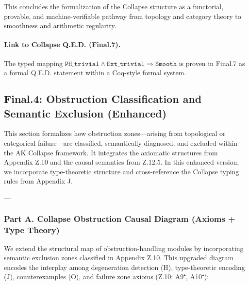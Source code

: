 \documentclass[11pt]{article}
\begin{document}
\begin{axiom}
\begin{axiom}
{{This concludes the formalization of the Collapse structure as a functorial, provable, and machine-verifiable pathway from topology and category theory to smoothness and arithmetic regularity.


\paragraph{Link to Collapse Q.E.D. (Final.7).}
The typed mapping \( \texttt{PH\_trivial} \land \texttt{Ext\_trivial} \Rightarrow \texttt{Smooth} \)  
is proven in Final.7 as a formal Q.E.D. statement within a Coq-style formal system.




\subsection*{Final.4: Obstruction Classification and Semantic Exclusion (Enhanced)}

This section formalizes how obstruction zones—arising from topological or categorical failure—are classified, semantically diagnosed,  
and excluded within the AK Collapse framework. It integrates the axiomatic structures from Appendix Z.10 and the causal semantics from Z.12.5.  
In this enhanced version, we incorporate type-theoretic structure and cross-reference the Collapse typing rules from Appendix J.

---

\subsubsection*{Part A. Collapse Obstruction Causal Diagram (Axioms + Type Theory)}

We extend the structural map of obstruction-handling modules by incorporating semantic exclusion zones classified in Appendix Z.10.  
This upgraded diagram encodes the interplay among degeneration detection (H), type-theoretic encoding (J), counterexamples (O),  
and failure zone axioms (Z.10: A9⁺, A10⁺):

}}
\end{axiom}
\end{axiom}
\end{document}
